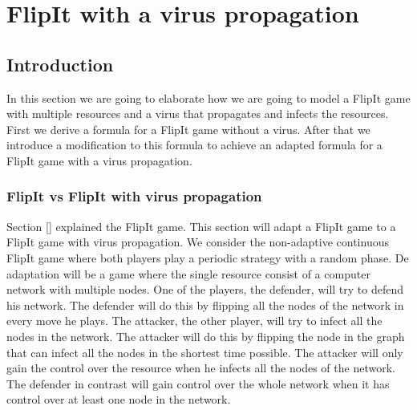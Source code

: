 \chapter{FlipIt with a virus propagation }
\label{cha:6}


\section{Introduction}

In this section we are going to elaborate how we are going to model a FlipIt game with multiple resources and a virus that propagates and infects the resources. First we derive a formula for a FlipIt game without a virus. After that we introduce a modification to this formula to achieve an adapted formula for a FlipIt game with a virus propagation. 

\subsection{FlipIt vs FlipIt with virus propagation}
Section [] explained the FlipIt game. This section will adapt a FlipIt game to a FlipIt game with virus propagation. We consider the non-adaptive continuous FlipIt game where both players play a periodic strategy with a random phase. De adaptation will be a game where the single resource consist of a computer network with multiple nodes. One of the players, the defender, will try to defend his network. The defender will do this by flipping all the nodes of the network in every move he plays. The attacker, the other player, will try to infect all the nodes in the network. The attacker will do this by flipping the node in the graph that can infect all the nodes in the shortest time possible. The attacker will only gain the control over the resource when he infects all the nodes of the network. The defender in contrast will gain control over the whole network when it has control over at least one node in the network. \\


